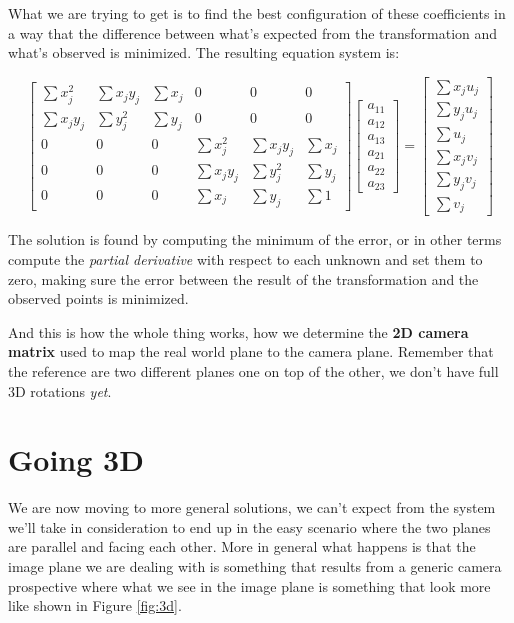 What we are trying to get is to find the best configuration of these coefficients in a way that the difference between what's expected from the transformation and what's observed is minimized. The resulting equation system is:

\[
    \begin{bmatrix}
        \sum x^2_j & \sum x_jy_j & \sum x_j & 0 & 0 & 0 \\
        \sum x_jy_j & \sum y^2_j & \sum y_j & 0 & 0 & 0 \\
        0 & 0 & 0 & \sum x^2_j & \sum x_jy_j & \sum x_j \\
        0 & 0 & 0 & \sum x_jy_j & \sum y^2_j & \sum y_j \\
        0 & 0 & 0 & \sum x_j & \sum y_j & \sum 1 
    \end{bmatrix}
    \begin{bmatrix}
        a_{11} \\
        a_{12} \\
        a_{13} \\
        a_{21} \\
        a_{22} \\
        a_{23}
    \end{bmatrix}
    =
    \begin{bmatrix}
        \sum x_ju_j \\
        \sum y_ju_j \\
        \sum u_j \\
        \sum x_jv_j \\
        \sum y_jv_j \\
        \sum v_j
    \end{bmatrix}
\]

The solution is found by computing the minimum of the error, or in other terms compute the \textit{partial derivative} with respect to each unknown and set them to zero, making sure the error between the result of the transformation and the observed points is minimized.

And this is how the whole thing works, how we determine the \textbf{2D camera matrix} used to map the real world plane to the camera plane. Remember that the reference are two different planes one on top of the other, we don't have full 3D rotations \textit{yet}.

\section{Going 3D}

We are now moving to more general solutions, we can't expect from the system we'll take in consideration to end up in the easy scenario where the two planes are parallel and facing each other.
More in general what happens is that the image plane we are dealing with is something that results from a generic camera prospective where what we see in the image plane is something that look more like shown in Figure \ref{fig:3d}.

